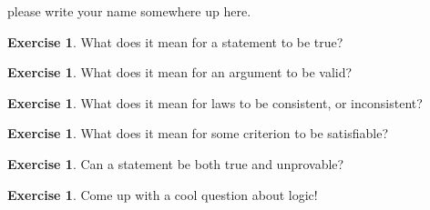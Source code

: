 \documentclass[letterpaper,12pt]{article}
\theoremstyle{plain}
\theoremstyle{definition}
\newtheorem{exer}[thm]{Exercise}
\theoremstyle{remark}
\begin{document}
\pagestyle{fancy}

please write your name somewhere up here.
\begin{exer}
What does it mean for a statement to be true?
\end{exer}
\hspace{3cm}
\begin{exer}
What does it mean for an argument to be valid?
\end{exer}
\hspace{3cm}
\begin{exer}
What does it mean for laws to be consistent, or inconsistent?
\end{exer}
\hspace{3cm}
\begin{exer}
What does it mean for some criterion to be satisfiable?
\end{exer}

\hspace{3cm}

\begin{exer}
Can a statement be both true and unprovable?
\end{exer}
\hspace{3cm}
\begin{exer} Come up with a cool question about logic!
\end{exer}
\end{document}
